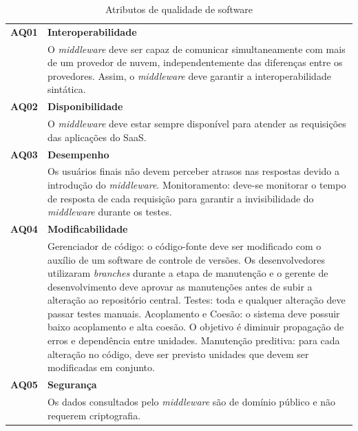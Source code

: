 \documentclass[11pt,a4paper]{article}
\begin{document}
\begin{table}[htb]
\centering
\caption{Atributos de qualidade de software} \label{tab:aqs}
\begin{tabular*}{\linewidth}{@{\extracolsep{\fill}}|r p{13cm}|} \hline
\textbf{AQ01} & \textbf{Interoperabilidade}\\ \cline{2-2}
 & O \textit{middleware} deve ser capaz de comunicar simultaneamente com mais de um provedor de nuvem, independentemente das diferenças entre os provedores. Assim, o \textit{middleware} deve garantir a interoperabilidade sintática.  \\\hline
\textbf{AQ02} & \textbf{Disponibilidade}\\ \cline{2-2}
 & O \textit{middleware} deve estar sempre disponível para atender as requisições das aplicações do SaaS.  \\ \hline
\textbf{AQ03} & \textbf{Desempenho}\\ \cline{2-2}
 & Os usuários finais não devem perceber atrasos nas respostas devido a introdução do \textit{middleware}. 
Monitoramento: deve-se monitorar o tempo de resposta de cada requisição para garantir a invisibilidade do \textit{middleware} durante os testes.   \\ \hline
 \textbf{AQ04} & \textbf{Modificabilidade}\\ \cline{2-2}
 & Gerenciador de código: o código-fonte deve ser modificado com o auxílio de um software de controle de versões. Os desenvolvedores utilizaram \textit{branches} durante a etapa de manutenção e o gerente de desenvolvimento deve aprovar as manutenções antes de subir a alteração ao repositório central. 
Testes: toda e qualquer alteração deve passar testes manuais. 
Acoplamento e Coesão: o sistema deve possuir baixo acoplamento e alta coesão. O objetivo é diminuir propagação de erros e dependência entre unidades. 
Manutenção preditiva: para cada alteração no código, deve ser previsto unidades que devem ser modificadas em conjunto.  \\ \hline
 \textbf{AQ05} & \textbf{Segurança}\\ \cline{2-2}
 & Os dados consultados pelo \textit{middleware} são de domínio público e não requerem criptografia.  \\ \hline
\end{tabular*}
\end{table}






\newpage
\end{document}
